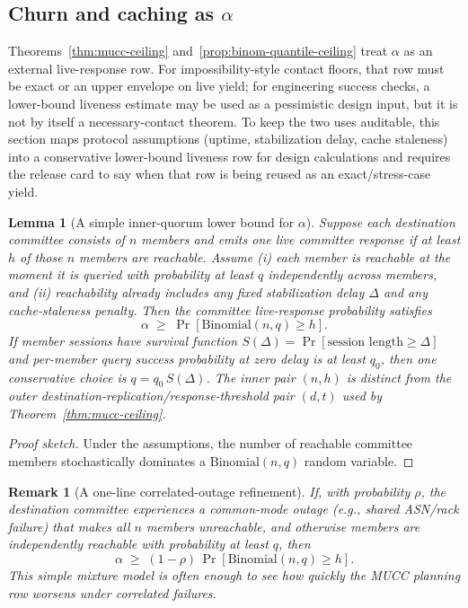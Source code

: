 \documentclass[11pt]{article}
\newtheorem{lemma}{Lemma}
\newtheorem{remark}{Remark}
\begin{document}
\subsection{Churn and caching as \texorpdfstring{$\alpha$}{alpha}}
\label{sec:churn_caching}
Theorems~\ref{thm:mucc-ceiling} and~\ref{prop:binom-quantile-ceiling} treat $\alpha$ as an external live-response row.
For impossibility-style contact floors, that row must be exact or an upper envelope on live yield; for engineering success checks, a lower-bound liveness estimate may be used as a pessimistic design input, but it is not by itself a necessary-contact theorem.
To keep the two uses auditable, this section maps protocol assumptions (uptime, stabilization delay, cache staleness) into a conservative lower-bound liveness row for design calculations and requires the release card to say when that row is being reused as an exact/stress-case yield.

\begin{lemma}[A simple inner-quorum lower bound for $\alpha$]
\label{lem:alpha-from-churn}
Suppose each destination committee consists of $n$ members and emits one live committee response if at least $h$ of those $n$ members are reachable.
Assume (i) each member is reachable at the moment it is queried with probability at least $q$ independently across members, and (ii) reachability already includes any fixed stabilization delay $\Delta$ and any cache-staleness penalty.
Then the committee live-response probability satisfies
\[
\alpha\;\ge\;\Pr[\mathrm{Binomial}(n,q)\ge h].
\]
If member sessions have survival function $S(\Delta)=\Pr[\text{session length}\ge \Delta]$ and per-member query success probability at zero delay is at least $q_0$, then one conservative choice is $q=q_0\,S(\Delta)$.
The inner pair $(n,h)$ is distinct from the outer destination-replication/response-threshold pair $(d,t)$ used by Theorem~\ref{thm:mucc-ceiling}.
\end{lemma}

\begin{proof}[Proof sketch]
Under the assumptions, the number of reachable committee members stochastically dominates a $\mathrm{Binomial}(n,q)$ random variable.
\end{proof}

\begin{remark}[A one-line correlated-outage refinement]
If, with probability $\rho$, the destination committee experiences a common-mode outage (e.g., shared ASN/rack failure) that makes all $n$ members unreachable, and otherwise members are independently reachable with probability at least $q$, then
\[\alpha\;\ge\;(1-\rho)\,\Pr[\mathrm{Binomial}(n,q)\ge h].\]
This simple mixture model is often enough to see how quickly the MUCC planning row worsens under correlated failures.
\end{remark}
\end{document}

